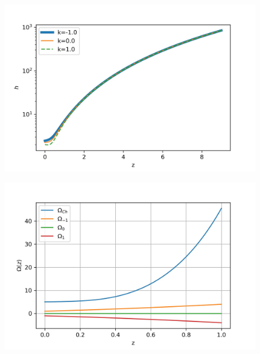 \documentclass{beamer}
\begin{document}
\begin{frame}
\begin{figure}[ht]
    \begin{minipage}{0.49\linewidth}
        \centering
        \includegraphics[width=\textwidth]{./Images/ch_H.jpg}
		\label{fig:ChH}
    \end{minipage}
    \begin{minipage}{0.49\linewidth}
        \centering
        \includegraphics[width=\textwidth]{./Images/ch_Om.jpg}
		\label{fig:ChFracEnDen}
    \end{minipage}
\end{figure}

\end{frame}
\end{document}
